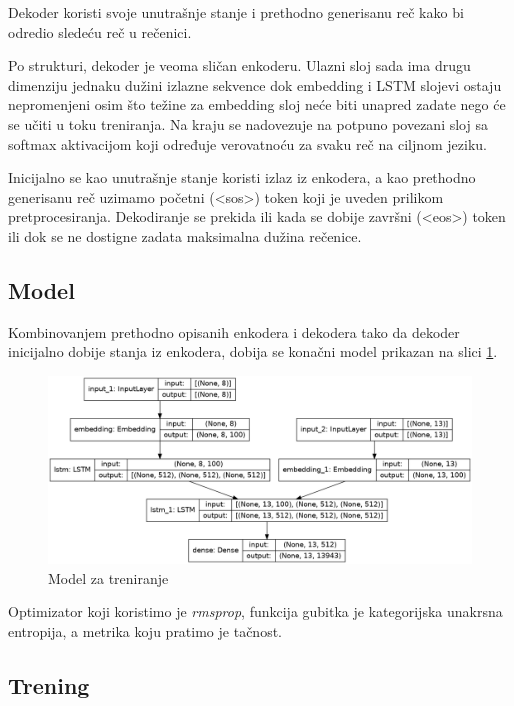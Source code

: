 \documentclass[a4paper]{article}
\begin{document}
Dekoder koristi svoje unutrašnje stanje i prethodno generisanu reč kako bi odredio sledeću reč u rečenici.

Po strukturi, dekoder je veoma sličan enkoderu.
Ulazni sloj sada ima drugu dimenziju jednaku dužini izlazne sekvence dok embedding i LSTM slojevi ostaju nepromenjeni osim što težine za embedding sloj neće biti unapred zadate nego će se učiti u toku treniranja.
Na kraju se nadovezuje na potpuno povezani sloj sa softmax aktivacijom koji određuje verovatnoću za svaku reč na ciljnom jeziku.

Inicijalno se kao unutrašnje stanje koristi izlaz iz enkodera, a kao prethodno generisanu reč uzimamo početni (\textless sos\textgreater) token koji je uveden prilikom pretprocesiranja. Dekodiranje se prekida ili kada se dobije završni (\textless eos\textgreater) token ili dok se ne dostigne zadata maksimalna dužina rečenice.

\subsection{Model}

Kombinovanjem prethodno opisanih enkodera i dekodera tako da dekoder inicijalno dobije stanja iz enkodera, dobija se konačni model prikazan na slici \ref{fig:model}.

\begin{figure}[h!]
  \centering
    \includegraphics[width=\textwidth]{model}
  \caption{Model za treniranje}
  \label{fig:model}
\end{figure}

Optimizator koji koristimo je \textit{rmsprop}, funkcija gubitka je kategorijska unakrsna entropija, a metrika koju pratimo je tačnost.

\subsection{Trening}
\end{document}
